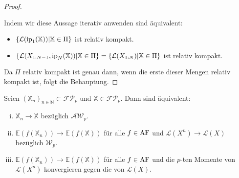 \begin{proof}
\begin{itemize}
    \end{itemize}
    Indem wir diese Aussage iterativ anwenden sind äquivalent:
    \begin{itemize}
        \item $\left\{\mathcal{L}(\operatorname{ip}_1(\mathbb{X})) \vert \mathbb{X} \in \Pi\right\}$ ist relativ kompakt.
        \item $\left\{ \mathcal{L}(X_{1:N-1}, \operatorname{ip}_N(\mathbb{X})) \vert \mathbb{X} \in \Pi \right\} = \left\{ \mathcal{L}(X_{1:N}) \vert \mathbb{X} \in \Pi \right\}$ ist relativ kompakt.
    \end{itemize}
    Da $\Pi$ relativ kompakt ist genau dann, wenn die erste dieser Mengen relativ kompakt ist, folgt die Behauptung.
\end{proof}

\begin{proposition}\label{thm:awp_convergence_char}
Seien $(\mathbb{X}_n)_{n\in\mathbb{N}} \subset \mathcal{FP}_p$ und $\mathbb{X} \in \mathcal{FP}_p$. Dann sind äquivalent:
\begin{enumerate}[(i)] 
    \item $\mathbb{X}_n \rightarrow \mathbb{X}$ bezüglich $\mathcal{AW}_p$.
    \item $\mathbb{E}(f(\mathbb{X}_n)) \rightarrow \mathbb{E}(f(\mathbb{X}))$ für alle $f \in \operatorname{AF}$ und $\mathcal{L}(X^n) \rightarrow \mathcal{L}(X)$ bezüglich $\mathcal{W}_p$.
    \item $\mathbb{E}(f(\mathbb{X}_n)) \rightarrow \mathbb{E}(f(\mathbb{X}))$ für alle $f \in \operatorname{AF}$ und die $p$-ten Momente von $\mathcal{L}(X^n)$ konvergieren gegen die von $\mathcal{L}(X)$. 
\end{enumerate}
\end{proposition}
